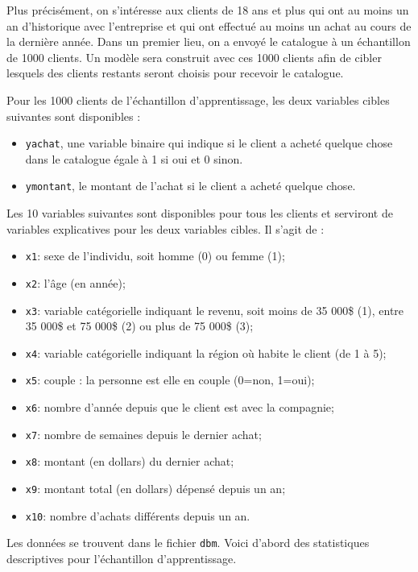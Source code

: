 \documentclass[
  11pt,
  letterpaper,
]{scrbook}
\providecommand{\tightlist}{%
  \setlength{\itemsep}{0pt}\setlength{\parskip}{0pt}}\usepackage{longtable,booktabs,array}
\theoremstyle{definition}
\theoremstyle{remark}
\begin{document}
Plus précisément, on s'intéresse aux clients de 18 ans et plus qui ont
au moins un an d'historique avec l'entreprise et qui ont effectué au
moins un achat au cours de la dernière année. Dans un premier lieu, on a
envoyé le catalogue à un échantillon de 1000 clients. Un modèle sera
construit avec ces 1000 clients afin de cibler lesquels des clients
restants seront choisis pour recevoir le catalogue.

Pour les 1000 clients de l'échantillon d'apprentissage, les deux
variables cibles suivantes sont disponibles :

\begin{itemize}
\tightlist
\item
  \texttt{yachat}, une variable binaire qui indique si le client a
  acheté quelque chose dans le catalogue égale à 1 si oui et 0 sinon.
\item
  \texttt{ymontant}, le montant de l'achat si le client a acheté quelque
  chose.
\end{itemize}

Les 10 variables suivantes sont disponibles pour tous les clients et
serviront de variables explicatives pour les deux variables cibles. Il
s'agit de :

\begin{itemize}
\tightlist
\item
  \texttt{x1}: sexe de l'individu, soit homme (0) ou femme (1);
\item
  \texttt{x2}: l'âge (en année);
\item
  \texttt{x3}: variable catégorielle indiquant le revenu, soit moins de
  35 000\$ (1), entre 35 000\$ et 75 000\$ (2) ou plus de 75 000\$ (3);
\item
  \texttt{x4}: variable catégorielle indiquant la région où habite le
  client (de 1 à 5);
\item
  \texttt{x5}: couple : la personne est elle en couple (0=non, 1=oui);
\item
  \texttt{x6}: nombre d'année depuis que le client est avec la
  compagnie;
\item
  \texttt{x7}: nombre de semaines depuis le dernier achat;
\item
  \texttt{x8}: montant (en dollars) du dernier achat;
\item
  \texttt{x9}: montant total (en dollars) dépensé depuis un an;
\item
  \texttt{x10}: nombre d'achats différents depuis un an.
\end{itemize}

Les données se trouvent dans le fichier \texttt{dbm}. Voici d'abord des
statistiques descriptives pour l'échantillon d'apprentissage.
\end{document}
